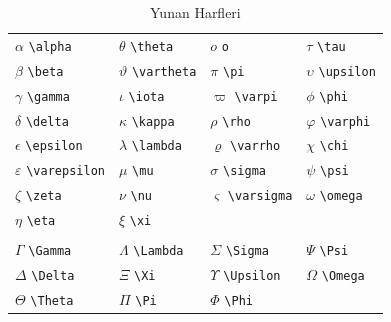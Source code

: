 \documentclass[
  10pt,
]{scrbook}
\theoremstyle{definition}
\theoremstyle{definition}
\theoremstyle{definition}
\theoremstyle{definition}
\theoremstyle{remark}
\begin{document}
\begin{longtable}[]{@{}
  >{\raggedright\arraybackslash}p{}
  >{\raggedright\arraybackslash}p{}
  >{\raggedright\arraybackslash}p{}
  >{\raggedright\arraybackslash}p{}@{}}
\caption{\label{tab:yunan} Yunan Harfleri}\tabularnewline
\toprule
\endhead
\(\alpha\) \texttt{\textbackslash{}alpha} & \(\theta\) \texttt{\textbackslash{}theta} & \(o\) \texttt{o} & \(\tau\) \texttt{\textbackslash{}tau} \\
\(\beta\) \texttt{\textbackslash{}beta} & \(\vartheta\) \texttt{\textbackslash{}vartheta} & \(\pi\) \texttt{\textbackslash{}pi} & \(\upsilon\) \texttt{\textbackslash{}upsilon} \\
\(\gamma\) \texttt{\textbackslash{}gamma} & \(\iota\) \texttt{\textbackslash{}iota} & \(\varpi\) \texttt{\textbackslash{}varpi} & \(\phi\) \texttt{\textbackslash{}phi} \\
\(\delta\) \texttt{\textbackslash{}delta} & \(\kappa\) \texttt{\textbackslash{}kappa} & \(\rho\) \texttt{\textbackslash{}rho} & \(\varphi\) \texttt{\textbackslash{}varphi} \\
\(\epsilon\) \texttt{\textbackslash{}epsilon} & \(\lambda\) \texttt{\textbackslash{}lambda} & \(\varrho\) \texttt{\textbackslash{}varrho} & \(\chi\) \texttt{\textbackslash{}chi} \\
\(\varepsilon\) \texttt{\textbackslash{}varepsilon} & \(\mu\) \texttt{\textbackslash{}mu} & \(\sigma\) \texttt{\textbackslash{}sigma} & \(\psi\) \texttt{\textbackslash{}psi} \\
\(\zeta\) \texttt{\textbackslash{}zeta} & \(\nu\) \texttt{\textbackslash{}nu} & \(\varsigma\) \texttt{\textbackslash{}varsigma} & \(\omega\) \texttt{\textbackslash{}omega} \\
\(\eta\) \texttt{\textbackslash{}eta} & \(\xi\) \texttt{\textbackslash{}xi} & & \\
& & & \\
\(\Gamma\) \texttt{\textbackslash{}Gamma} & \(\Lambda\) \texttt{\textbackslash{}Lambda} & \(\Sigma\) \texttt{\textbackslash{}Sigma} & \(\Psi\) \texttt{\textbackslash{}Psi} \\
\(\Delta\) \texttt{\textbackslash{}Delta} & \(\Xi\) \texttt{\textbackslash{}Xi} & \(\Upsilon\) \texttt{\textbackslash{}Upsilon} & \(\Omega\) \texttt{\textbackslash{}Omega} \\
\(\Theta\) \texttt{\textbackslash{}Theta} & \(\Pi\) \texttt{\textbackslash{}Pi} & \(\Phi\) \texttt{\textbackslash{}Phi} & \\
\bottomrule
\end{longtable}
\end{document}

